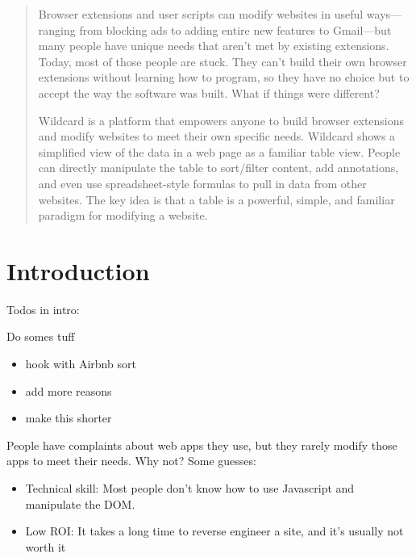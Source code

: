 \documentclass[english,submission]{programming}
\providecommand{\tightlist}{%
  \setlength{\itemsep}{0pt}\setlength{\parskip}{0pt}}
\begin{document}
\begin{abstract}
Browser extensions and user scripts can modify websites in useful
ways---ranging from blocking ads to adding entire new features to
Gmail---but many people have unique needs that aren't met by existing
extensions. Today, most of those people are stuck. They can't build
their own browser extensions without learning how to program, so they
have no choice but to accept the way the software was built. What if
things were different?

Wildcard is a platform that empowers anyone to build browser extensions
and modify websites to meet their own specific needs. Wildcard shows a
simplified view of the data in a web page as a familiar table view.
People can directly manipulate the table to sort/filter content, add
annotations, and even use spreadsheet-style formulas to pull in data
from other websites. The key idea is that a table is a powerful, simple,
and familiar paradigm for modifying a website.
\end{abstract}


\hypertarget{introduction}{%
\section{Introduction}\label{introduction}}

Todos in intro:

Do somes tuff

\begin{itemize}
\tightlist
\item
  hook with Airbnb sort
\item
  add more reasons
\item
  make this shorter
\end{itemize}

People have complaints about web apps they use, but they rarely modify
those apps to meet their needs. Why not? Some guesses:

\begin{itemize}
\tightlist
\item
  Technical skill: Most people don't know how to use Javascript and
  manipulate the DOM.
\item
  Low ROI: It takes a long time to reverse engineer a site, and it's
  usually not worth it
\end{itemize}
\end{document}
